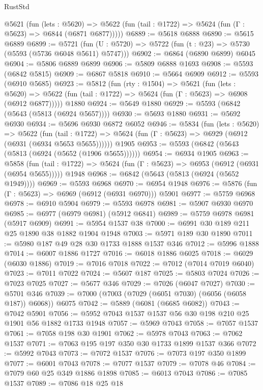\begin{lexlean}{RustStd}
\begin{coremodule}
    @5621
      (fun (lets : @5620) =>
      @5622 (fun (tail : @1722) => @5624 (fun (Γ : @5623) => @6844 (@6871 @6877)))))
@6889 := @5618 @6888
@6890 := @5615 @6889
@6899 := @5721 (fun (U : @5720) => @5722 (fun (t : @23) => @5730 (@5593 (@5736 @6048 @5611) @5747)))
@6902 := @6864 (@6890 @6899) @6045
@6904 := @5806 @6889 @6899
@6906 := @5809 @6888 @1693
@6908 := @5593 (@6842 @5815)
@6909 := @6867 @5818
@6910 := @5664 @6909
@6912 := @5593 (@6910 @5685)
@6923 := @5812
    (fun (rty : @1504) =>
    @5621
      (fun (lets : @5620) =>
      @5622 (fun (tail : @1722) => @5624 (fun (Γ : @5623) => @6908 (@6912 @6877)))))
    @1880
@6924 := @5649 @1880
@6929 := @5593 (@6842 (@5643 (@5813 (@6924 @5657))))
@6930 := @5693 @1880
@6931 := @5692 @6930
@6934 := @5696 @6930 @6872 @6052
@6946 := @5834
    (fun (lets : @5620) =>
    @5622
      (fun (tail : @1722) => @5624 (fun (Γ : @5623) => @6929 (@6912 (@6931 (@6934 @5653 @5655))))))
    @1905
@6953 := @5593 (@6842 (@5643 (@5813 (@6924 (@5652 (@1906 @5655))))))
@6954 := @6934 @1905
@6963 := @5858
    (fun (tail : @1722) => @5624 (fun (Γ : @5623) => @6953 (@6912 (@6931 (@6954 @5655)))))
    @1948
@6968 := @6842 (@5643 (@5813 (@6924 (@5652 @1949))))
@6969 := @5593 @6968
@6970 := @6954 @1948
@6976 := @5876 (fun (Γ : @5623) => @6969 (@6912 (@6931 @6970))) @5901
@6977 := @5759 @6968
@6978 := @6910 @5904
@6979 := @5593 @6978
@6981 := @5907 @6930 @6970
@6985 := @6977 (@6979 @6981) (@5912 @6841)
@6989 := @5759 @6978 @6981 (@5917 @6909)
@6991 := @5954 @1537 @38
@7000 := @6991 @30 @189 @211 @25 @1890 @38 @1882 @1904 @1948
@7003 := @5971 @189 @30 @1890
@7011 := @5980 @187 @49 @28 @30 @1733 @1888 @1537 @346
@7012 := @5996 @1888
@7014 := @6007 @1886 @1727
@7016 := @6018 @1886 @6025
@7018 := @6029 (@6030 @1886)
@7019 := @7016 @7018
@7022 := @7012 (@7014 @7019 @6040)
@7023 := @7011 @7022
@7024 := @5607 @187
@7025 := @5803 @7024
@7026 := @7023 @7025
@7027 := @5677 @346
@7029 := @7026 (@6047 @7027)
@7030 := @5701 @346
@7039 := @7000 (@7003 (@7029 (@6051 @7030) (@6056 (@6058 @187)) @6068)) @6075
@7042 := @5889 (@6081 (@6685 @6082))
@7043 := @7042 @5901
@7056 := @5952 @7043 @1537 @1537 @56 @30 @198 @210 @25 @1901 @56 @1882 @1733 @1948
@7057 := @5969 @7043
@7058 := @7057 @1537
@7061 := @7058 @198 @30 @1901
@7062 := @5978 @7043
@7063 := @7062 @1537
@7071 := @7063 @195 @197 @350 @30 @1733 @1899 @1537 @366
@7072 := @5992 @7043
@7073 := @7072 @1537
@7076 := @7073 @197 @350 @1899
@7077 := @6001 @7043
@7078 := @7077 @1537
@7079 := @7078 @46
@7084 := @7079 @60 @25 @349 @1886 @1898
@7085 := @6013 @7043
@7086 := @7085 @1537
@7089 := @7086 @18 @25 @18

\end{coremodule}
\end{lexlean}
